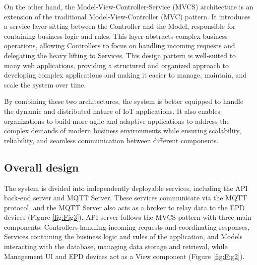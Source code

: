 \documentclass[../Main.tex]{subfiles}
\begin{document}
On the other hand, the Model-View-Controller-Service (MVCS) architecture is an extension of the traditional Model-View-Controller (MVC) pattern. It introduces a service layer sitting between the Controller and the Model, responsible for containing business logic and rules. This layer abstracts complex business operations, allowing Controllers to focus on handling incoming requests and delegating the heavy lifting to Services. This design pattern is well-suited to many web applications, providing a structured and organized approach to developing complex applications and making it easier to manage, maintain, and scale the system over time.

By combining these two architectures, the system is better equipped to handle the dynamic and distributed nature of IoT applications. It also enables organizations to build more agile and adaptive applications to address the complex demands of modern business environments while ensuring scalability, reliability, and seamless communication between different components.

\subsection{Overall design}
The system is divided into independently deployable services, including the API back-end server and MQTT Server. These services communicate via the MQTT protocol, and the MQTT Server also acts as a broker to relay data to the \gls{EPD} devices (Figure \ref{fig:Fig3}). API server follows the MVCS pattern with three main components: Controllers handling incoming requests and coordinating responses, Services containing the business logic and rules of the application, and Models interacting with the database, managing data storage and retrieval, while Management UI and \gls{EPD} devices act as a View component (Figure \ref{fig:Fig2}).
\end{document}
